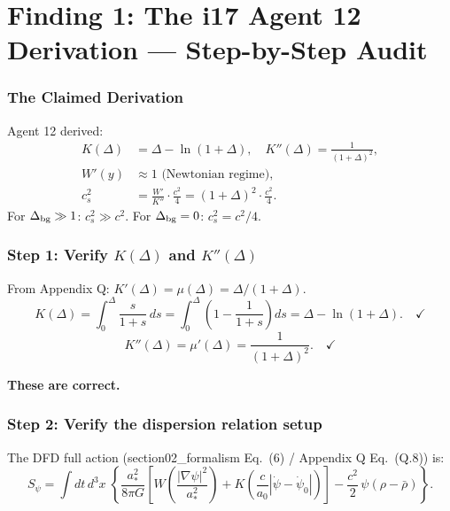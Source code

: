 \documentclass[11pt]{article}
\begin{document}
\part{Finding 1: The i17 Agent 12 Derivation --- Step-by-Step Audit}
\label{part:audit}

\section{The Claimed Derivation}

Agent 12 derived:
\begin{align}
K(\Delta) &= \Delta - \ln(1+\Delta), \quad K''(\Delta) = \frac{1}{(1+\Delta)^2}, \\
W'(y) &\approx 1 \text{ (Newtonian regime)}, \\
c_s^2 &= \frac{W'}{K''} \cdot \frac{c^2}{4}
= (1+\Delta)^2 \cdot \frac{c^2}{4}.
\end{align}
For $\Delta_{\rm bg} \gg 1$: $c_s^2 \gg c^2$. For $\Delta_{\rm bg} = 0$: $c_s^2 = c^2/4$.

\section{Step 1: Verify $K(\Delta)$ and $K''(\Delta)$}

From Appendix Q: $K'(\Delta) = \mu(\Delta) = \Delta/(1+\Delta)$.
\begin{equation}
K(\Delta) = \int_0^\Delta \frac{s}{1+s}\,ds
= \int_0^\Delta \left(1 - \frac{1}{1+s}\right)ds
= \Delta - \ln(1+\Delta). \quad\checkmark
\end{equation}
\begin{equation}
K''(\Delta) = \mu'(\Delta) = \frac{1}{(1+\Delta)^2}. \quad\checkmark
\end{equation}

\textbf{These are correct.}

\section{Step 2: Verify the dispersion relation setup}

The DFD full action (section02\_formalism Eq.~(6) / Appendix Q Eq.~(Q.8)) is:
\begin{equation}
S_\psi = \int dt\,d^3x\;\left\{
  \frac{a_*^2}{8\pi G}\left[
    W\!\left(\frac{|\nabla\psi|^2}{a_*^2}\right)
    + K\!\left(\frac{c}{a_0}|\dot\psi - \dot\psi_0|\right)
  \right]
  - \frac{c^2}{2}\,\psi(\rho - \bar\rho)
\right\}.
\label{eq:action-paper}
\end{equation}
\end{document}

